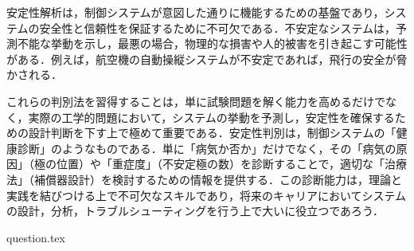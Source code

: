 \documentclass[11pt,a4paper]{ltjsarticle}
\begin{document}
安定性解析は，制御システムが意図した通りに機能するための基盤であり，システムの安全性と信頼性を保証するために不可欠である．不安定なシステムは，予測不能な挙動を示し，最悪の場合，物理的な損害や人的被害を引き起こす可能性がある．例えば，航空機の自動操縦システムが不安定であれば，飛行の安全が脅かされる．

これらの判別法を習得することは，単に試験問題を解く能力を高めるだけでなく，実際の工学的問題において，システムの挙動を予測し，安定性を確保するための設計判断を下す上で極めて重要である．安定性判別は，制御システムの「健康診断」のようなものである．単に「病気か否か」だけでなく，その「病気の原因」（極の位置）や「重症度」（不安定極の数）を診断することで，適切な「治療法」（補償器設計）を検討するための情報を提供する．この診断能力は，理論と実践を結びつける上で不可欠なスキルであり，将来のキャリアにおいてシステムの設計，分析，トラブルシューティングを行う上で大いに役立つであろう．

\begin{thebibliography}{1}
 question.tex
\end{thebibliography}
\end{document}
